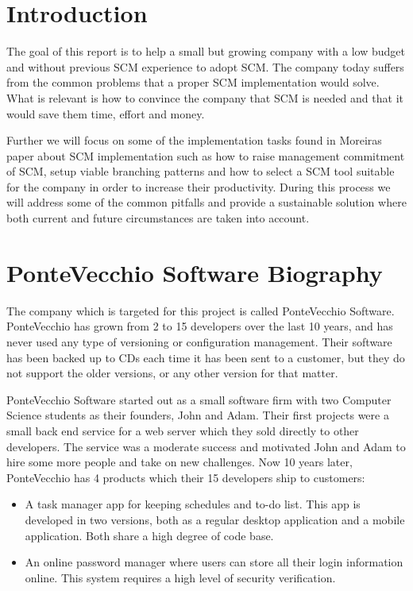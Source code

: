 \documentclass[10pt]{article}
\begin{document}
\section{Introduction}
The goal of this report is to help a small but growing company with a low budget and without previous SCM experience to adopt SCM. The company today suffers from the common problems that a proper SCM implementation would solve. What is relevant is how to convince the company that SCM is needed and that it would save them time, effort and money. 

\noindent Further we will focus on some of the implementation tasks found in Moreiras \cite{Moreira} paper about SCM implementation such as how to raise management commitment of SCM, setup viable branching patterns and how to select a SCM tool suitable for the company in order to increase their productivity. During this process we will address some of the common pitfalls and provide a sustainable solution where both current and future circumstances are taken into account.

\section{PonteVecchio Software Biography}
The company which is targeted for this project is called PonteVecchio Software. PonteVecchio has grown from 2 to 15 developers over the last 10 years, and has never used any type of versioning or configuration management. Their software has been backed up to CDs each time it has been sent to a customer, but they do not support the older versions, or any other version for that matter.

\noindent PonteVecchio Software started out as a small software firm with two Computer Science students as their founders, John and Adam. Their first projects were a small back end service for a web server which they sold directly to other developers. The service was a moderate success and motivated John and Adam to hire some more people and take on new challenges. Now 10 years later, PonteVecchio has 4 products which their 15 developers ship to customers:
\begin{itemize}
\item A task manager app for keeping schedules and to-do list. This app is developed in two versions, both as a regular desktop application and a mobile application. Both share a high degree of code base. 
\item An online password manager where users can store all their login information online. This system requires a high level of security verification.
\end{itemize}
\end{document}
